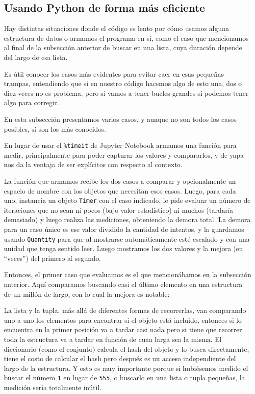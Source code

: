 \subsection{Usando Python de forma más eficiente}

Hay distintas situaciones donde el código es lento por cómo usamos alguna estructura de datos o armamos el programa en sí, como el caso que mencionamos al final de la subsección anterior de buscar en una lista, cuya duración depende del largo de esa lista.

Es útil conocer los casos más evidentes para evitar caer en esas pequeñas trampas, entendiendo que si en nuestro código hacemos algo de esto una, dos o diez veces no es problema, pero si vamos a tener bucles grandes sí podemos tener algo para corregir.

En esta subsección presentamos varios casos, y aunque no son todos los casos posibles, sí son los más conocidos.

En lugar de usar el \texttt{\%timeit} de Jupyter Notebook armamos una función para medir, principalmente para poder capturar los valores y compararlos, y de yapa nos da la ventaja de ser explícitos con respecto al contexto.


La función que armamos recibe los dos casos a comparar y opcionalmente un espacio de nombre con los objetos que necesitan esos casos. Luego, para cada uno, instancia un objeto \texttt{Timer} con el caso indicado, le pide evaluar un número de iteraciones que no sean ni pocos (bajo valor estadístico) ni muchos (tardaría demasiado) y luego realiza las mediciones, obteniendo la demora total. La demora para un caso único es ese valor dividido la cantidad de intentos, y la guardamos usando \texttt{Quantity} para que al mostrarse automáticamente esté escalado y con una unidad que tenga sentido leer. Luego mostramos los dos valores y la mejora (en ``veces'') del primero al segundo.

Entonces, el primer caso que evaluamos es el que mencionábamos en la subsección anterior. Aquí comparamos buscando casi el último elemento en una estructura de un millón de largo, con lo cual la mejora es notable:


La lista y la tupla, más allá de diferentes formas de recorrerlas, van comparando uno a uno los elementos para encontrar si el objeto está incluido, entonces si lo encuentra en la primer posición va a tardar casi nada pero si tiene que recorrer toda la estructura va a tardar en función de cuan larga sea la misma. El diccionario (como el conjunto) calcula el hash del objeto y lo busca directamente; tiene el costo de calcular el hash pero después es un acceso independiente del largo de la estructura. Y esto es muy importante porque si hubiésemos medido el buscar el número \texttt{1} en lugar de \texttt{555}, o buscarlo en una lista o tupla pequeñas, la medición sería totalmente inútil.


